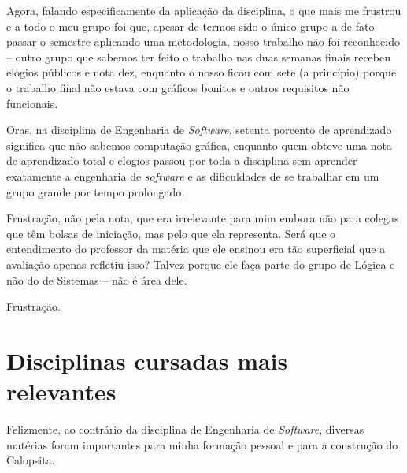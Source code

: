 \documentclass[titlepage,a4paper]{article}
\newcommand{\software}{\textit{software}}
\newcommand{\calopsita}{Calopsita}
\begin{document}
Agora, falando especificamente da aplicação da disciplina, o que mais me frustrou e a todo o meu grupo foi que, apesar de termos sido o único grupo a de fato passar o semestre aplicando uma metodologia, nosso trabalho não foi reconhecido -- outro grupo que sabemos ter feito o trabalho nas duas semanas finais recebeu elogios públicos e nota dez, enquanto o nosso ficou com sete (a princípio) porque o trabalho final não estava com gráficos bonitos e outros requisitos não funcionais.

Oras, na disciplina de Engenharia de \textit{Software}, setenta porcento de aprendizado significa que não sabemos computação gráfica, enquanto quem obteve uma nota de aprendizado total e elogios passou por toda a disciplina sem aprender exatamente a engenharia de \software{} e as dificuldades de se trabalhar em um grupo grande por tempo prolongado.

Frustração, não pela nota, que era irrelevante para mim embora não para colegas que têm bolsas de iniciação, mas pelo que ela representa. Será que o entendimento do professor da matéria que ele ensinou era tão superficial que a avaliação apenas refletiu isso? Talvez porque ele faça parte do grupo de Lógica e não do de Sistemas -- não é área dele.

Frustração.

\section{Disciplinas cursadas mais relevantes}

Felizmente, ao contrário da disciplina de Engenharia de \textit{Software}, diversas matérias foram importantes para minha formação pessoal e para a construção do \calopsita{}.
\end{document}
